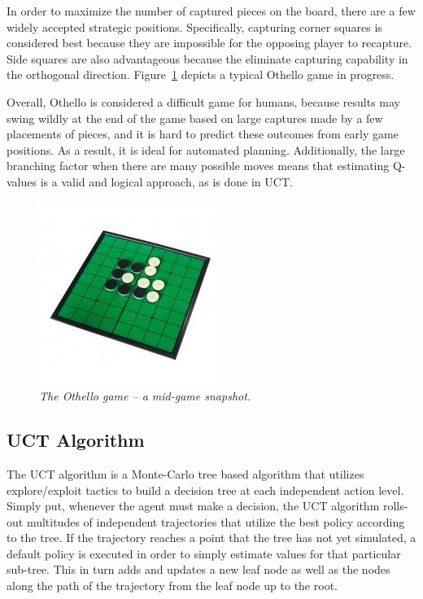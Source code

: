 \documentclass[12pt,letterpaper]{article}
\begin{document}
In order to maximize the number of captured pieces on the board, there are a few widely accepted strategic positions.  Specifically, capturing corner squares is considered best because they are impossible for the opposing player to recapture. Side squares are also advantageous because the eliminate capturing capability in the orthogonal direction. Figure~\ref{fig1} depicts a typical Othello game in progress.

Overall, Othello is considered a difficult game for humans, because results may swing wildly at the end of the game based on large captures made by a few placements of pieces, and it is hard to predict these outcomes from early game positions. As a result, it is ideal for automated planning. Additionally, the large branching factor when there are many possible moves means that estimating Q-values is a valid and logical approach, as is done in UCT.

\begin{figure}[!h]
\begin{center}
\includegraphics[scale=1]{othello_board}
\caption{\textit{The Othello game -- a mid-game snapshot.}}
\label{fig1}
\end{center}
\end{figure}

\subsection{UCT Algorithm}
The UCT algorithm is a Monte-Carlo tree based algorithm that utilizes explore/exploit tactics to build a decision tree at each independent action level. Simply put, whenever the agent must make a decision, the UCT algorithm rolls-out multitudes of independent trajectories that utilize the best policy according to the tree. If the trajectory reaches a point that the tree has not yet simulated, a default policy is executed in order to simply estimate values for that particular sub-tree.  This in turn adds and updates a new leaf node as well as the nodes along the path of the trajectory from the leaf node up to the root.
\end{document}
